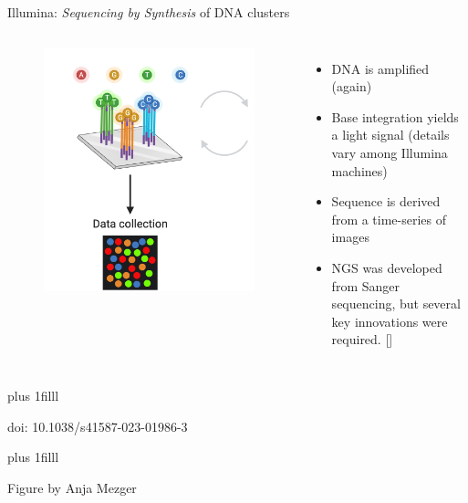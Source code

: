 \documentclass[10pt]{beamer}
\newcommand{\creditdark}[1]{{\vskip0pt plus 1filll \par \raggedleft \scriptsize \mdseries \color{scMGray} #1 \par}}
\newcommand{\creditdarkleft}[1]{{\vskip0pt plus 1filll \par \raggedright \scriptsize \mdseries \color{scMGray} #1 \par}}
\newcommand{\citeme}[1]{{\xspace\color{scAqua} \scriptsize [\cite{#1}]}}
\begin{document}
\begin{frame}[standout]{Illumina: \textit{Sequencing by Synthesis} of DNA clusters}
	\begin{columns}[T,onlytextwidth]
		\hspace*{-0.7cm} 
		\begin{figure}
			\includegraphics[width=\textwidth]{figures/ngs-cycles.png}
		\end{figure}
		\normalsize \normalfont
		\begin{itemize}
			\item DNA is amplified (again)
			\item Base integration yields a light signal (details vary among Illumina machines)
			\item Sequence is derived from a time-series of images
			\item NGS was developed from Sanger sequencing, but several key innovations were required.\citeme{Rodriguez2023}
		\end{itemize}
	\end{columns}
 	\creditdark{doi: 10.1038/s41587-023-01986-3} \par
	\creditdarkleft{Figure by Anja Mezger}
\end{frame}
\end{document}
